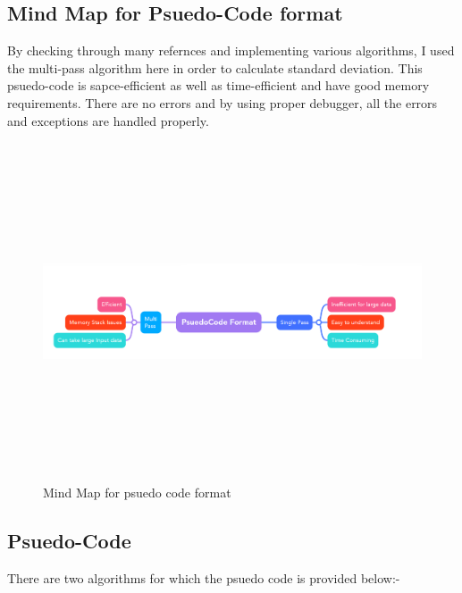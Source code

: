 \documentclass[11pt]{report}
\begin{document}
\subsection{\Large \vspace{0.2 cm}Mind Map for Psuedo-Code format}
By checking through many refernces and implementing various algorithms, I used the multi-pass algorithm here in order to calculate standard deviation.
This psuedo-code is sapce-efficient as well as time-efficient and have good memory requirements. There are no errors and by using proper debugger, all the errors and exceptions are handled properly.
\begin{figure}[h!]
\begin{center}
  \includegraphics[width=15cm, height=10cm]{images/Mind Map.png} 
  \end{center}
  \caption{\vspace{0.8 cm}Mind Map for psuedo code format}
\end{figure}


\pagebreak

\subsection{\Large \vspace{0.2 cm}Psuedo-Code}There are two algorithms for which the psuedo code is provided below:-
\end{document}
